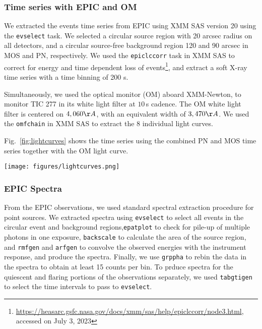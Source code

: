\documentclass[twocolumn]{aastex631}
\begin{document}
\subsubsection{Time series with EPIC and OM}

 We extracted the events time series from EPIC using XMM SAS version 20 using the \texttt{evselect} task. We selected a circular source region with 20 arcsec radius on all detectors, and a circular source-free background region 120 and 90 arcsec in MOS and PN, respectively. We used the \texttt{epiclccorr} task in XMM SAS to correct for energy and time dependent loss of events\footnote{\url{https://heasarc.gsfc.nasa.gov/docs/xmm/sas/help/epiclccorr/node3.html}, accessed on July 3, 2023}, and extract a soft X-ray time series with a time binning of 200 s.

Simultaneously, we used the optical monitor (OM) aboard XMM-Newton, to monitor TIC 277 in its white light filter at $10$\,s cadence. The OM white light filter is centered on $4,060\AA$, with an equivalent width of $3,470\AA$. We used the \texttt{omfchain} in XMM SAS to extract the 8 individual light curves.

Fig.~\ref{fig:lightcurves} shows the time series using the combined PN and MOS time series together with the OM light curve.

\begin{figure*}[ht!]
    \begin{centering}
        \texttt{[image: figures/lightcurves.png]}
        \caption{
         Top panel: Optical Monitoring (OM) light curve. Bottom panel: X-ray (PN, MOS1 and MOS2 combined) light curve. 
        }
        \label{fig:lightcurves}
    \end{centering}
\end{figure*}


\subsubsection{EPIC Spectra}
From the EPIC observations, we used standard spectral extraction procedure for point sources. We extracted spectra using \texttt{evselect} to select all events in the circular event and background regions,\texttt{epatplot} to check for pile-up of multiple photons in one exposure, \texttt{backscale} to calculate the area of the source region, and \texttt{rmfgen} and \texttt{arfgen} to convolve the observed energies with the instrument response, and produce the spectra. Finally, we use \texttt{grppha} to rebin the data in the spectra to obtain at least 15 counts per bin. To prduce spectra for the quiescent and flaring portions of the observations separately, we used \texttt{tabgtigen} to select the time intervals to pass to \texttt{evselect}.
\end{document}
